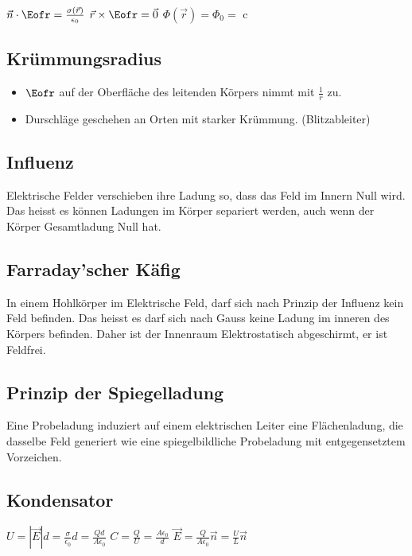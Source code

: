 \documentclass[10pt,a4paper]{scrartcl}
\begin{document}
\begin{multicols*}{3}
		$\vec{n}\cdot\Eofr = \frac{\sigma(\vec{r})}{\epsilon_0}$ \hfill $\vec{r}\times\Eofr=\vec{0}$ \hfill $\Phi(\vec{r})=\Phi_0=$ c		
		
	\subsection*{Krümmungsradius}
		
		\begin{itemize}[itemsep=0pt]
			\compaq
			\item
			$\Eofr$ auf der Oberfläche des leitenden Körpers nimmt mit $\frac{1}{r}$ zu.			
			\item
			Durschläge geschehen an Orten mit starker Krümmung. (Blitzableiter)		
		\end{itemize}	
	
	\subsection{Influenz}
	
	\small
		Elektrische Felder verschieben ihre Ladung so, dass das Feld im Innern Null wird. Das heisst es können Ladungen im Körper separiert werden, auch wenn der Körper Gesamtladung Null hat.\normalsize
	
	\subsection{Farraday'scher Käfig}
	
	\small
	In einem Hohlkörper im Elektrische Feld, darf sich nach Prinzip der Influenz kein Feld befinden. Das heisst es darf sich nach Gauss keine Ladung im inneren des Körpers befinden. Daher ist der Innenraum Elektrostatisch abgeschirmt, er ist Feldfrei.
	\normalsize
	
	\subsection{Prinzip der Spiegelladung}	
	
	\small
	Eine Probeladung induziert auf einem elektrischen Leiter eine Flächenladung, die dasselbe Feld generiert wie eine spiegelbildliche Probeladung mit entgegensetztem Vorzeichen.			
	\normalsize	
	
	\subsection{Kondensator}
	$U=|\vec{E}|d=\frac{\sigma}{\epsilon_0}d=\frac{Q d}{A \epsilon_0}$ \hfill $C = \frac{Q}{U}=\frac{A\epsilon_0}{d}$ \hfill$\vec{E}=\frac{Q}{A\epsilon_0}\vec{n}=\frac{U}{L}\vec{n}$
	

\end{multicols*}
\end{document}
